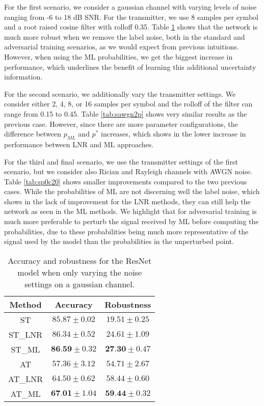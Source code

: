 \documentclass[conference]{IEEEtran}
\begin{document}
For the first scenario, we consider a gaussian channel with varying levels of noise ranging from -6 to 18 dB SNR. For the transmitter, we use 8 samples per symbol and a root raised cosine filter with rolloff 0.35. Table \ref{tab:sbasic} shows that the network is much more robust when we remove the label noise, both in the standard and adversarial training scenarios, as we would expect from previous intuitions. However, when using the ML probabilities, we get the biggest increase in performance, which underlines the benefit of learning this additional uncertainty information.

For the second scenario, we additionally vary the transmitter settings. We consider either 2, 4, 8, or 16 samples per symbol and the rolloff of the filter can range from 0.15 to 0.45. Table \ref{tab:sawgn2p} shows very similar results as the previous case. However, since there are more parameter configurations, the difference between $p_{ML}$ and $p^{*}$ increases, which shows in the lower increase in performance between LNR and ML approaches.

For the third and final scenario, we use the transmitter settings of the first scenario, but we consider also Rician and Rayleigh channels with AWGN noise. Table \ref{tab:sp0c20} shows smaller improvements compared to the two previous cases. While the probabilities of ML are not discerning well the label noise, which shows in the lack of improvement for the LNR methods, they can still help the network as seen in the ML methods. We highlight that for adversarial training is much more preferable to perturb the signal received by ML before computing the probabilities, due to these probabilities being much more representative of the signal used by the model than the probabilities in the unperturbed point.

\begin{table}[htbp]
	\centering
	\begin{tabular}{c|cc}
	    Method & Accuracy & Robustness \\
		\hline
		ST & $85.87 \pm 0.02$ & $19.51 \pm 0.25$ \\ 
		ST\_LNR & $86.34 \pm 0.52$ & $24.61 \pm 1.09$ \\ 
		ST\_ML & $\textbf{86.59} \pm 0.32$ & $\textbf{27.30} \pm 0.47$ \\ 
		\hline
		AT & $57.36 \pm 3.12$ & $54.71 \pm 2.67$ \\ 
		AT\_LNR & $64.50 \pm 0.62$ & $58.44 \pm 0.60$ \\ 
		AT\_ML & $\textbf{67.01} \pm 1.04$ & $\textbf{59.44} \pm 0.32$ \\ 
    \end{tabular}
    \caption{Accuracy and robustness for the ResNet model when only varying the noise settings on a gaussian channel.}
    \label{tab:sbasic}
\end{table}
\end{document}

